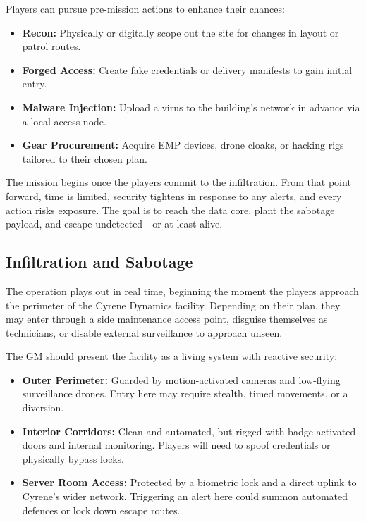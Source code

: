 \documentclass[nodeprecatedcode,bg=print]{dndbook}
\begin{document}
\begin{multicols}{2}
Players can pursue pre-mission actions to enhance their chances:
\begin{itemize}
    \item \textbf{Recon:} Physically or digitally scope out the site for changes in layout or patrol routes.
    \item \textbf{Forged Access:} Create fake credentials or delivery manifests to gain initial entry.
    \item \textbf{Malware Injection:} Upload a virus to the building's network in advance via a local access node.
    \item \textbf{Gear Procurement:} Acquire EMP devices, drone cloaks, or hacking rigs tailored to their chosen plan.
\end{itemize}

The mission begins once the players commit to the infiltration. From that point forward, time is limited, security tightens in response to any alerts, and every action risks exposure. The goal is to reach the data core, plant the sabotage payload, and escape undetected—or at least alive.


\subsection*{Infiltration and Sabotage}

The operation plays out in real time, beginning the moment the players approach the perimeter of the Cyrene Dynamics facility. Depending on their plan, they may enter through a side maintenance access point, disguise themselves as technicians, or disable external surveillance to approach unseen.

The GM should present the facility as a living system with reactive security:

\begin{itemize}
    \item \textbf{Outer Perimeter:} Guarded by motion-activated cameras and low-flying surveillance drones. Entry here may require stealth, timed movements, or a diversion.
    \item \textbf{Interior Corridors:} Clean and automated, but rigged with badge-activated doors and internal monitoring. Players will need to spoof credentials or physically bypass locks.
    \item \textbf{Server Room Access:} Protected by a biometric lock and a direct uplink to Cyrene’s wider network. Triggering an alert here could summon automated defences or lock down escape routes.
\end{itemize}


\end{multicols}
\end{document}
